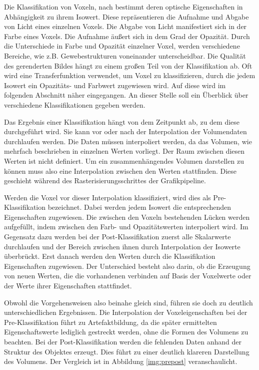 Die Klassifikation von Voxeln, nach \cite{Hadwiger06} bestimmt deren optische Eigenschaften in Abhängigkeit zu ihrem Isowert. Diese repräsentieren die Aufnahme und Abgabe von Licht eines einzelnen Voxels. Die Abgabe von Licht manifestiert sich in der Farbe eines Voxels. Die Aufnahme äußert sich in dem Grad der Opazität. Durch die Unterschiede in Farbe und Opazität einzelner Voxel, werden verschiedene Bereiche, wie z.B. Gewebestrukturen voneinander unterscheidbar. Die Qualität des gerenderten Bildes hängt zu einem großen Teil von der Klassifikation ab. Oft wird eine Transferfunktion verwendet, um Voxel zu klassifizieren, durch die jedem Isowert ein Opazitäts- und Farbwert zugewiesen wird. Auf diese wird im folgenden Abschnitt näher eingegangen. 
An dieser Stelle soll ein Überblick über verschiedene Klassifikationen gegeben werden.

Das Ergebnis einer Klassifikation hängt von dem Zeitpunkt ab, zu dem diese durchgeführt wird. Sie kann vor oder nach der Interpolation der Volumendaten durchlaufen werden.
Die Daten müssen interpoliert werden, da das Volumen, wie mehrfach beschrieben in einzelnen Werten vorliegt. Der Raum zwischen diesen Werten ist nicht definiert. Um ein zusammenhängendes Volumen darstellen zu können muss also eine Interpolation zwischen den Werten stattfinden. Diese geschieht während des Rasterisierungsschrittes der Grafikpipeline.

Werden die Voxel vor dieser Interpolation klassifiziert, wird dies als Pre-Klassifikation bezeichnet. Dabei werden jedem Isowert die entsprechenden Eigenschaften zugewiesen. Die zwischen den Voxeln bestehenden Lücken werden aufgefüllt, indem zwischen den Farb- und Opazitätswerten interpoliert wird. 
Im Gegensatz dazu werden bei der Post-Klassifikation zuerst alle Skalarwerte durchlaufen und der Bereich zwischen ihnen durch Interpolation der Isowerte überbrückt. Erst danach werden den Werten durch die Klassifikation Eigenschaften zugewiesen. Der Unterschied besteht also darin, ob die Erzeugung von neuen Werten, die die vorhandenen verbinden auf Basis der Voxelwerte oder der Werte ihrer Eigenschaften stattfindet. 

Obwohl die Vorgehensweisen also beinahe gleich sind, führen sie doch zu deutlich unterschiedlichen Ergebnissen. Die Interpolation der Voxeleigenschaften bei der Pre-Klassifikation führt zu Artefaktbildung, da die später ermittelten Eigenschaftswerte lediglich gestreckt werden, ohne die Formen des Volumens zu beachten. Bei der Post-Klassifikation werden die fehlenden Daten anhand der Struktur des Objektes erzeugt. Dies führt zu einer deutlich klareren Darstellung des Volumens. Der Vergleich ist in Abbildung \ref{img:prepost} veranschaulicht.

